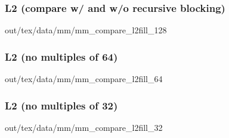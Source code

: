 \documentclass[12pt,dvipdfmx]{beamer}
\begin{document}
\begin{frame}
\frametitle{L2 (compare w/ and w/o recursive blocking)}
\begin{center}
\def\svgwidth{0.8\textwidth}  
out/tex/data/mm/mm\_compare\_l2fill\_128
\end{center}
\end{frame}

\begin{frame}
\frametitle{L2 (no multiples of 64)}
\begin{center}
\def\svgwidth{0.8\textwidth}  
out/tex/data/mm/mm\_compare\_l2fill\_64
\end{center}
\end{frame}


\begin{frame}
\frametitle{L2 (no multiples of 32)}
\begin{center}
\def\svgwidth{0.8\textwidth}  
out/tex/data/mm/mm\_compare\_l2fill\_32
\end{center}
\end{frame}


\fi                             %

\end{document}
